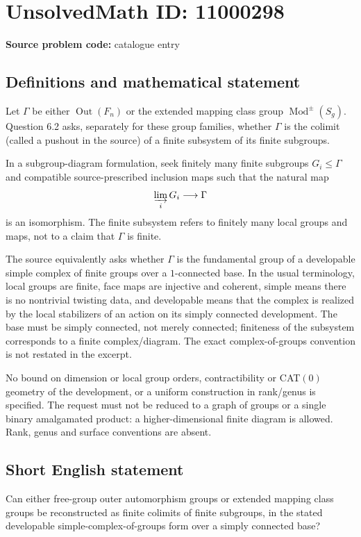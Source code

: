 \documentclass[11pt]{article}
\begin{document}
\section*{UnsolvedMath ID: 11000298}
\textbf{Source problem code:} catalogue entry
\subsection{Definitions and mathematical statement}
Let $\Gamma$ be either $\operatorname{Out}(F_n)$ or the extended mapping class group $\operatorname{Mod}^{\pm}(S_g)$. Question 6.2 asks, separately for these group families, whether $\Gamma$ is the colimit (called a pushout in the source) of a finite subsystem of its finite subgroups.

In a subgroup-diagram formulation, seek finitely many finite subgroups $G_i\leq\Gamma$ and compatible source-prescribed inclusion maps such that the natural map
\[
 \varinjlim_i G_i\longrightarrow\Gamma
\]
is an isomorphism. The finite subsystem refers to finitely many local groups and maps, not to a claim that $\Gamma$ is finite.

The source equivalently asks whether $\Gamma$ is the fundamental group of a developable simple complex of finite groups over a $1$-connected base. In the usual terminology, local groups are finite, face maps are injective and coherent, simple means there is no nontrivial twisting data, and developable means that the complex is realized by the local stabilizers of an action on its simply connected development. The base must be simply connected, not merely connected; finiteness of the subsystem corresponds to a finite complex/diagram. The exact complex-of-groups convention is not restated in the excerpt.

No bound on dimension or local group orders, contractibility or CAT$(0)$ geometry of the development, or a uniform construction in rank/genus is specified. The request must not be reduced to a graph of groups or a single binary amalgamated product: a higher-dimensional finite diagram is allowed. Rank, genus and surface conventions are absent.
\subsection{Short English statement}
Can either free-group outer automorphism groups or extended mapping class groups be reconstructed as finite colimits of finite subgroups, in the stated developable simple-complex-of-groups form over a simply connected base?
\end{document}
